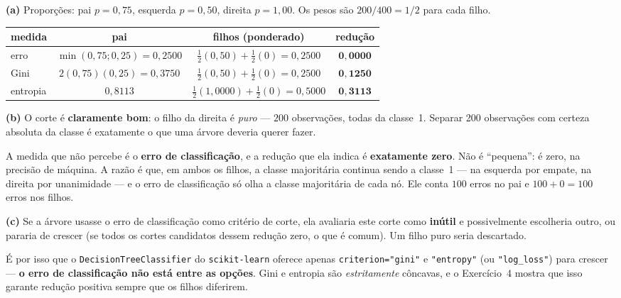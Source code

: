 \documentclass[11pt,a4paper]{article}
\begin{document}
\begin{solucao}
\textbf{(a)} Proporções: pai $p=0{,}75$, esquerda $p=0{,}50$, direita $p=1{,}00$.
Os pesos são $200/400 = 1/2$ para cada filho.
\begin{center}\small
\renewcommand{\arraystretch}{1.4}
\begin{tabular}{@{}lccc@{}}
\toprule
medida & pai & filhos (ponderado) & redução \\
\midrule
erro       & $\min(0{,}75;0{,}25)=0{,}2500$
           & $\tfrac12(0{,}50)+\tfrac12(0)=0{,}2500$
           & $\mathbf{0{,}0000}$ \\
Gini       & $2(0{,}75)(0{,}25)=0{,}3750$
           & $\tfrac12(0{,}50)+\tfrac12(0)=0{,}2500$
           & $\mathbf{0{,}1250}$ \\
entropia   & $0{,}8113$
           & $\tfrac12(1{,}0000)+\tfrac12(0)=0{,}5000$
           & $\mathbf{0{,}3113}$ \\
\bottomrule
\end{tabular}
\end{center}

\smallskip
\textbf{(b)} O corte é \textbf{claramente bom}: o filho da direita é
\emph{puro} --- $200$ observações, todas da classe~1. Separar 200 observações com
certeza absoluta da classe é exatamente o que uma árvore deveria querer fazer.

A medida que não percebe é o \textbf{erro de classificação}, e a redução que ela
indica é \textbf{exatamente zero}. Não é ``pequena'': é zero, na precisão de
máquina. A razão é que, em ambos os filhos, a classe majoritária continua sendo
a classe~1 --- na esquerda por empate, na direita por unanimidade --- e o erro de
classificação só olha a classe majoritária de cada nó. Ele conta $100$ erros no
pai e $100+0=100$ erros nos filhos.

\smallskip
\textbf{(c)} Se a árvore usasse o erro de classificação como critério de corte,
ela avaliaria este corte como \textbf{inútil} e possivelmente escolheria outro,
ou pararia de crescer (se todos os cortes candidatos dessem redução zero, o que é
comum). Um filho puro seria descartado.

É por isso que o \texttt{DecisionTreeClassifier} do \texttt{scikit-learn} oferece
apenas \texttt{criterion="gini"} e \texttt{"entropy"} (ou \texttt{"log\_loss"})
para crescer --- \textbf{o erro de classificação não está entre as opções}. Gini e
entropia são \emph{estritamente} côncavas, e o Exercício~4 mostra que isso garante
redução positiva sempre que os filhos diferirem.


\end{solucao}
\end{document}
